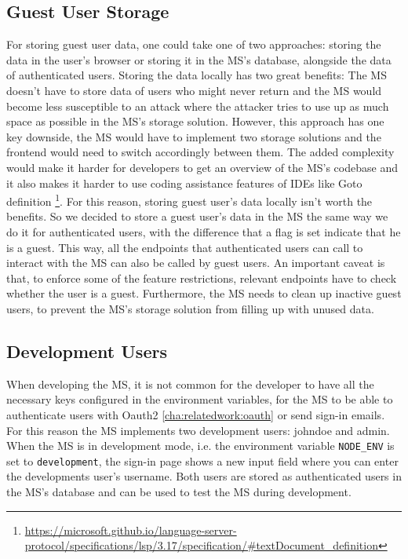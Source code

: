 \subsection{Guest User Storage}

For storing guest user data, one could take one of two approaches:
storing the data in the user's browser or storing it in the MS's database, alongside the
data of authenticated users.
Storing the data locally has two great benefits:
The MS doesn't have to store data of users who might never return and
the MS would become less susceptible to an attack where the attacker tries to use up as
much space as possible in the MS's storage solution.
However, this approach has one key downside, the MS would have to implement two storage
solutions and the frontend would need to switch accordingly between them.
The added complexity would make it harder for developers to get an overview of the MS's
codebase and it also makes it harder to use coding assistance features of IDEs like Goto
definition \footnote{\url{https://microsoft.github.io/language-server-protocol/specifications/lsp/3.17/specification/\#textDocument_definition}}.
For this reason, storing guest user's data locally isn't worth the benefits.
So we decided to store a guest user's data in the MS the same way we do it for
authenticated users,
with the difference that a flag is set
indicate that he is a guest.
This way, all the endpoints that authenticated users can call to interact with the MS
can also be called by guest users.
An important caveat is that, to enforce some of the feature restrictions, relevant
endpoints have to check whether the user is a guest.
Furthermore, the MS needs to clean up inactive guest users, to prevent the MS's storage
solution from filling up with unused data.

\subsection{Development Users}

When developing the MS, it is not common for the developer to have all the necessary keys
configured in the environment variables, for the MS to be able to authenticate users with
Oauth2 \ref{cha:relatedwork:oauth} or send sign-in emails.
For this reason the MS implements two development users: johndoe and admin.
When the MS is in development mode, i.e. the environment variable \lstinline{NODE_ENV} is
set to \lstinline{development},
the sign-in page shows a new input field where you can enter the developments user's username.
Both users are stored as authenticated users in the MS's database and can be used to test
the MS during development.


